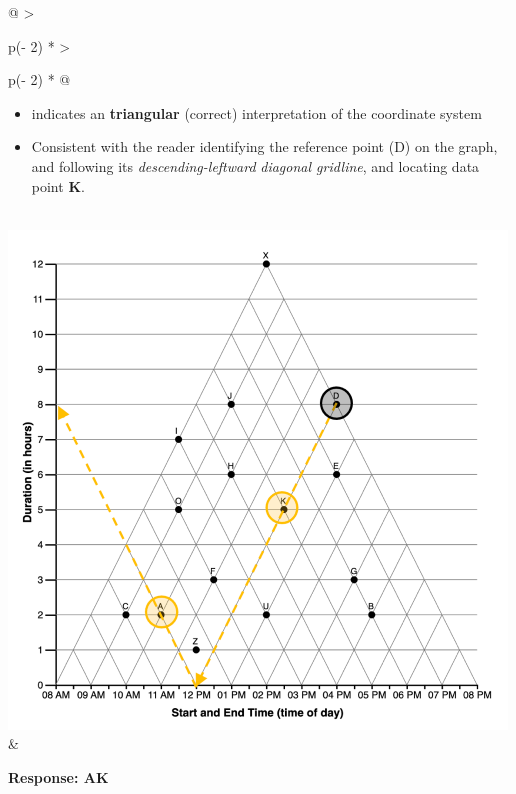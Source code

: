 \documentclass[
  letterpaper,
  DIV=11,
  numbers=noendperiod]{scrreprt}
\begin{document}
\begin{longtable}[]{@{}
  >{\raggedright\arraybackslash}p{(\columnwidth - 2\tabcolsep) * }
  >{\raggedright\arraybackslash}p{(\columnwidth - 2\tabcolsep) * }@{}}
\begin{minipage}[t]{\linewidth}
\begin{itemize}
\item
  indicates an \textbf{triangular} (correct) interpretation of the
  coordinate system
\item
  Consistent with the reader identifying the reference point (D) on the
  graph, and following its \emph{descending-leftward} \emph{diagonal
  gridline}, and locating data point \textbf{K}.
\end{itemize}
\end{minipage} \\
\includegraphics[width=5.20833in,height=\textheight]{analysis/SGC3A/static/interpretations/Q2_111_AK.png}
& \begin{minipage}[t]{\linewidth}\raggedright
\textbf{Response: AK}


\end{minipage}
\end{longtable}
\end{document}
